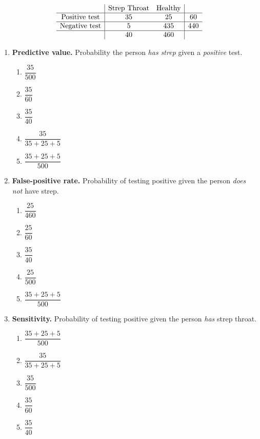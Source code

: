 
\[
\begin{array}{c|cc|c}
   & \text{Strep Throat} & \text{Healthy} & \\ \hline
\text{Positive test} & 35 & 25 & 60 \\ \hline
\text{Negative test} &  5 & 435 & 440 \\ \hline
   & 40 & 460 &
\end{array}
\]

\begin{enumerate}[label=\textbf{S\arabic*.}]

\item \textbf{Predictive value.} Probability the person \emph{has strep} given a \emph{positive} test. 
\begin{enumerate}[label=(\Alph*)]
\item $\dfrac{35}{500}$
\item $\dfrac{35}{60}$
\item $\dfrac{35}{40}$
\item $\dfrac{35}{35+25+5}$
\item $\dfrac{35+25+5}{500}$
\end{enumerate}

\item \textbf{False-positive rate.} Probability of testing positive given the person \emph{does not} have strep. 
\begin{enumerate}[label=(\Alph*)]
\item $\dfrac{25}{460}$
\item $\dfrac{25}{60}$
\item $\dfrac{35}{40}$
\item $\dfrac{25}{500}$
\item $\dfrac{35+25+5}{500}$
\end{enumerate}

\item \textbf{Sensitivity.} Probability of testing positive given the person \emph{has} strep throat. 
\begin{enumerate}[label=(\Alph*)]
\item $\dfrac{35+25+5}{500}$
\item $\dfrac{35}{35+25+5}$
\item $\dfrac{35}{500}$
\item $\dfrac{35}{60}$
\item $\dfrac{35}{40}$
\end{enumerate}


\end{enumerate}
